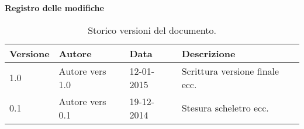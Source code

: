 \begin{Large}
	\textbf{Registro delle modifiche}
\end{Large}

\begin{table}[h]
\begin{center}
\begin{tabular}{|l|l|l|l|}
\hline
\textbf{Versione} & \textbf{Autore} & \textbf{Data} & \textbf{Descrizione} \\
\hline
1.0 & Autore vers 1.0 & 12-01-2015 & Scrittura versione finale ecc. \\
\hline
0.1 & Autore vers 0.1 & 19-12-2014 & Stesura scheletro ecc. \\
\hline
\end{tabular}
\caption{Storico versioni del documento.}
\end{center}
\end{table}
